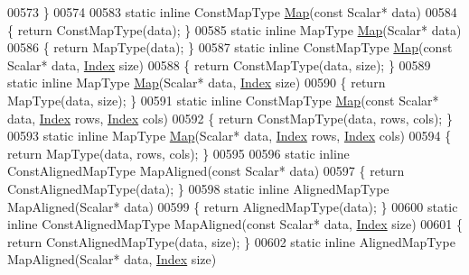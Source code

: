 \begin{DoxyCode}
00573     \}
00574 
00583     \textcolor{keyword}{static} \textcolor{keyword}{inline} ConstMapType \hyperlink{group___core___module_class_eigen_1_1_map}{Map}(\textcolor{keyword}{const} Scalar* data)
00584     \{ \textcolor{keywordflow}{return} ConstMapType(data); \}
00585     \textcolor{keyword}{static} \textcolor{keyword}{inline} MapType \hyperlink{group___core___module_class_eigen_1_1_map}{Map}(Scalar* data)
00586     \{ \textcolor{keywordflow}{return} MapType(data); \}
00587     \textcolor{keyword}{static} \textcolor{keyword}{inline} ConstMapType \hyperlink{group___core___module_class_eigen_1_1_map}{Map}(\textcolor{keyword}{const} Scalar* data, \hyperlink{namespace_eigen_a62e77e0933482dafde8fe197d9a2cfde}{Index} size)
00588     \{ \textcolor{keywordflow}{return} ConstMapType(data, size); \}
00589     \textcolor{keyword}{static} \textcolor{keyword}{inline} MapType \hyperlink{group___core___module_class_eigen_1_1_map}{Map}(Scalar* data, \hyperlink{namespace_eigen_a62e77e0933482dafde8fe197d9a2cfde}{Index} size)
00590     \{ \textcolor{keywordflow}{return} MapType(data, size); \}
00591     \textcolor{keyword}{static} \textcolor{keyword}{inline} ConstMapType \hyperlink{group___core___module_class_eigen_1_1_map}{Map}(\textcolor{keyword}{const} Scalar* data, \hyperlink{namespace_eigen_a62e77e0933482dafde8fe197d9a2cfde}{Index} rows, \hyperlink{namespace_eigen_a62e77e0933482dafde8fe197d9a2cfde}{Index} cols)
00592     \{ \textcolor{keywordflow}{return} ConstMapType(data, rows, cols); \}
00593     \textcolor{keyword}{static} \textcolor{keyword}{inline} MapType \hyperlink{group___core___module_class_eigen_1_1_map}{Map}(Scalar* data, \hyperlink{namespace_eigen_a62e77e0933482dafde8fe197d9a2cfde}{Index} rows, \hyperlink{namespace_eigen_a62e77e0933482dafde8fe197d9a2cfde}{Index} cols)
00594     \{ \textcolor{keywordflow}{return} MapType(data, rows, cols); \}
00595 
00596     \textcolor{keyword}{static} \textcolor{keyword}{inline} ConstAlignedMapType MapAligned(\textcolor{keyword}{const} Scalar* data)
00597     \{ \textcolor{keywordflow}{return} ConstAlignedMapType(data); \}
00598     \textcolor{keyword}{static} \textcolor{keyword}{inline} AlignedMapType MapAligned(Scalar* data)
00599     \{ \textcolor{keywordflow}{return} AlignedMapType(data); \}
00600     \textcolor{keyword}{static} \textcolor{keyword}{inline} ConstAlignedMapType MapAligned(\textcolor{keyword}{const} Scalar* data, \hyperlink{namespace_eigen_a62e77e0933482dafde8fe197d9a2cfde}{Index} size)
00601     \{ \textcolor{keywordflow}{return} ConstAlignedMapType(data, size); \}
00602     \textcolor{keyword}{static} \textcolor{keyword}{inline} AlignedMapType MapAligned(Scalar* data, \hyperlink{namespace_eigen_a62e77e0933482dafde8fe197d9a2cfde}{Index} size)

\end{DoxyCode}
